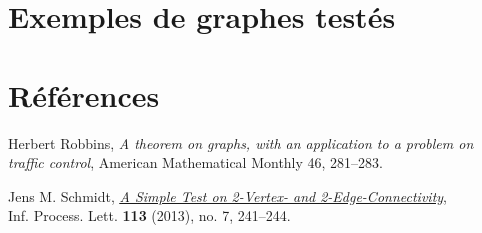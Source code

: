 \documentclass{article}      %
\begin{document}
\section{Exemples de graphes testés}



\section{Références}
\begin{thebibliography}{9}
Herbert Robbins, \textit{A theorem on graphs, with an application to a problem on traffic control}, American Mathematical Monthly 46, 281–283.

Jens M. Schmidt, \href{https://arxiv.org/ftp/arxiv/papers/1209/1209.0700.pdf}{\underline{\textit{A Simple Test on 2-Vertex- and 2-Edge-Connectivity}}},
\\Inf. Process. Lett. \textbf{113} (2013), no. 7, 241–244.
\end{thebibliography}
\end{document}
